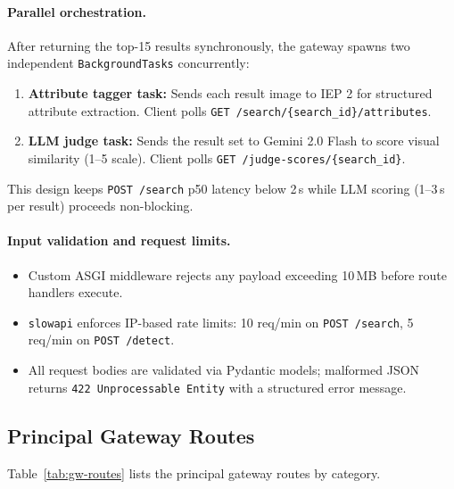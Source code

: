 \documentclass[12pt]{article}
\begin{document}
\paragraph{Parallel orchestration.}
After returning the top-15 results synchronously, the gateway spawns two independent \texttt{BackgroundTasks} concurrently:
\begin{enumerate}[leftmargin=*]
  \item \textbf{Attribute tagger task:} Sends each result image to IEP 2 for structured attribute extraction. Client polls \texttt{GET /search/\{search\_id\}/attributes}.
  \item \textbf{LLM judge task:} Sends the result set to Gemini 2.0 Flash to score visual similarity (1--5 scale). Client polls \texttt{GET /judge-scores/\{search\_id\}}.
\end{enumerate}
This design keeps \texttt{POST /search} p50 latency below 2\,s while LLM scoring (1--3\,s per result) proceeds non-blocking.

\paragraph{Input validation and request limits.}
\begin{itemize}[leftmargin=*]
  \item Custom ASGI middleware rejects any payload exceeding 10\,MB before route handlers execute.
  \item \texttt{slowapi} enforces IP-based rate limits: 10 req/min on \texttt{POST /search}, 5 req/min on \texttt{POST /detect}.
  \item All request bodies are validated via Pydantic models; malformed JSON returns \texttt{422 Unprocessable Entity} with a structured error message.
\end{itemize}

\subsection{Principal Gateway Routes}

Table~\ref{tab:gw-routes} lists the principal gateway routes by category.
\end{document}
